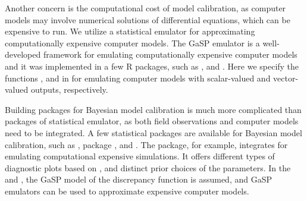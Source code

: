 {Another concern is the computational cost of model calibration, as computer models may involve  numerical solutions of differential equations, which can be expensive to run. We utilize} a statistical emulator    for approximating computationally expensive computer models. The GaSP emulator  is a well-developed framework for emulating computationally expensive computer models and it was implemented in a few {R} packages, such as  \citep{roustant2012dicekriging},  \citep{macdonald2015gpfit} and   \citep{gu2018robustgasp}. Here we specify the functions ,  and  in  for emulating  computer models with scalar-valued and vector-valued outputs, respectively. 





Building packages for Bayesian model calibration is much more complicated than packages of statistical emulator, as both field observations and computer models {need to be} integrated.  A few statistical packages are available for Bayesian model calibration, such as  \citep{hankin2005introducing},   package \citep{palomo2015save}, and  \citep{carmassi2018calico}. The  package, for example, integrates    for emulating computational expensive simulations. It offers different types of diagnostic plots based on  \citep{wickham2011ggplot2}, and {distinct} prior choices of the parameters. In the  and , the GaSP model of the discrepancy function \citep{kennedy2001bayesian} { is assumed, and GaSP emulators can  be used to approximate  expensive computer models}. 

